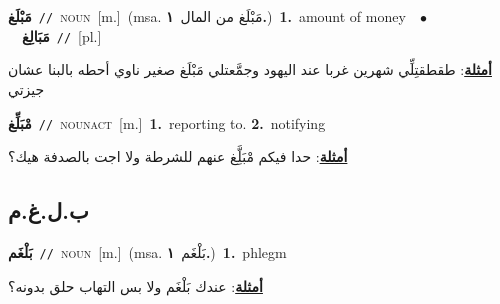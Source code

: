 \documentclass[10pt,a4paper,twoside]{article} %
\begin{document}
\begin{multicols}{2}
{\setlength\topsep{0pt}\textbf{\foreignlanguage{arabic}{مَبْلَغ}}\ {\color{gray}\texttt{//}\color{black}}\ \textsc{noun}\ [m.]\ \color{gray}(msa. \foreignlanguage{arabic}{مَبْلَغ من المال}~\foreignlanguage{arabic}{\textbf{١.}})\color{black}\ \textbf{1.}~amount of money\ \ $\bullet$\ \ \setlength\topsep{0pt}\textbf{\foreignlanguage{arabic}{مَبَالِغ}}\ {\color{gray}\texttt{//}\color{black}}\ [pl.]\  \begin{flushright}\color{gray}\foreignlanguage{arabic}{\textbf{\underline{\foreignlanguage{arabic}{أمثلة}}}: طقطقتِلِّي شهرين غربا عند اليهود وجمَّعتلي مَبْلَغ صغير ناوي أحطه بالبنا عشان جيزتي}\end{flushright}\color{black}} \vspace{2mm}

{\setlength\topsep{0pt}\textbf{\foreignlanguage{arabic}{مْبَلِّغ}}\ {\color{gray}\texttt{//}\color{black}}\ \textsc{noun\textunderscore act}\ [m.]\ \textbf{1.}~reporting to.  \textbf{2.}~notifying\  \begin{flushright}\color{gray}\foreignlanguage{arabic}{\textbf{\underline{\foreignlanguage{arabic}{أمثلة}}}: حدا فيكم مْبَلَِّغ عنهم للشرطة ولا اجت بالصدفة هيك؟}\end{flushright}\color{black}} \vspace{2mm}

\vspace{-3mm}
\subsection*{\color{blue}\foreignlanguage{arabic}{ب.ل.غ.م}\color{blue}{}} 

{\setlength\topsep{0pt}\textbf{\foreignlanguage{arabic}{بَلْغَم}}\ {\color{gray}\texttt{//}\color{black}}\ \textsc{noun}\ [m.]\ \color{gray}(msa. \foreignlanguage{arabic}{بَلْغَم}~\foreignlanguage{arabic}{\textbf{١.}})\color{black}\ \textbf{1.}~phlegm\  \begin{flushright}\color{gray}\foreignlanguage{arabic}{\textbf{\underline{\foreignlanguage{arabic}{أمثلة}}}: عندك بَلْغَم ولا بس التهاب حلق بدونه؟}\end{flushright}\color{black}} \vspace{2mm}


\end{multicols}
\end{document}
